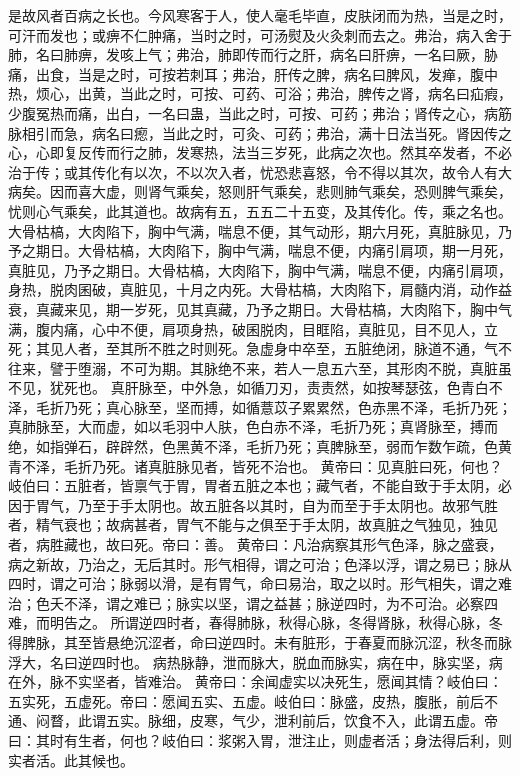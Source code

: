 \documentclass[a4paper,12pt,UTF8,twoside]{ctexbook}
\begin{document}
是故风者百病之长也。今风寒客于人，使人毫毛毕直，皮肤闭而为热，当是之时，可汗而发也；或痹不仁肿痛，当时之时，可汤熨及火灸刺而去之。弗治，病入舍于肺，名曰肺痹，发咳上气；弗治，肺即传而行之肝，病名曰肝痹，一名曰厥，胁痛，出食，当是之时，可按若刺耳；弗治，肝传之脾，病名曰脾风，发瘅，腹中热，烦心，出黄，当此之时，可按、可药、可浴；弗治，脾传之肾，病名曰疝瘕，少腹冤热而痛，出白，一名曰蛊，当此之时，可按、可药；弗治；肾传之心，病筋脉相引而急，病名曰瘛，当此之时，可灸、可药；弗治，满十日法当死。肾因传之心，心即复反传而行之肺，发寒热，法当三岁死，此病之次也。然其卒发者，不必治于传；或其传化有以次，不以次入者，忧恐悲喜怒，令不得以其次，故令人有大病矣。因而喜大虚，则肾气乘矣，怒则肝气乘矣，悲则肺气乘矣，恐则脾气乘矣，忧则心气乘矣，此其道也。故病有五，五五二十五变，及其传化。传，乘之名也。
大骨枯槁，大肉陷下，胸中气满，喘息不便，其气动形，期六月死，真脏脉见，乃予之期日。大骨枯槁，大肉陷下，胸中气满，喘息不便，内痛引肩项，期一月死，真脏见，乃予之期日。大骨枯槁，大肉陷下，胸中气满，喘息不便，内痛引肩项，身热，脱肉囷破，真脏见，十月之内死。大骨枯槁，大肉陷下，肩髓内消，动作益衰，真藏来见，期一岁死，见其真藏，乃予之期日。大骨枯槁，大肉陷下，胸中气满，腹内痛，心中不便，肩项身热，破囷脱肉，目眶陷，真脏见，目不见人，立死；其见人者，至其所不胜之时则死。急虚身中卒至，五脏绝闭，脉道不通，气不往来，譬于堕溺，不可为期。其脉绝不来，若人一息五六至，其形肉不脱，真脏虽不见，犹死也。
真肝脉至，中外急，如循刀刃，责责然，如按琴瑟弦，色青白不泽，毛折乃死；真心脉至，坚而搏，如循薏苡子累累然，色赤黑不泽，毛折乃死；真肺脉至，大而虚，如以毛羽中人肤，色白赤不泽，毛折乃死；真肾脉至，搏而绝，如指弹石，辟辟然，色黑黄不泽，毛折乃死；真脾脉至，弱而乍数乍疏，色黄青不泽，毛折乃死。诸真脏脉见者，皆死不治也。
黄帝曰：见真脏曰死，何也？岐伯曰：五脏者，皆禀气于胃，胃者五脏之本也；藏气者，不能自致于手太阴，必因于胃气，乃至于手太阴也。故五脏各以其时，自为而至于手太阴也。故邪气胜者，精气衰也；故病甚者，胃气不能与之俱至于手太阴，故真脏之气独见，独见者，病胜藏也，故曰死。帝曰：善。
黄帝曰：凡治病察其形气色泽，脉之盛衰，病之新故，乃治之，无后其时。形气相得，谓之可治；色泽以浮，谓之易已；脉从四时，谓之可治；脉弱以滑，是有胃气，命曰易治，取之以时。形气相失，谓之难治；色夭不泽，谓之难已；脉实以坚，谓之益甚；脉逆四时，为不可治。必察四难，而明告之。
所谓逆四时者，春得肺脉，秋得心脉，冬得肾脉，秋得心脉，冬得脾脉，其至皆悬绝沉涩者，命曰逆四时。未有脏形，于春夏而脉沉涩，秋冬而脉浮大，名曰逆四时也。
病热脉静，泄而脉大，脱血而脉实，病在中，脉实坚，病在外，脉不实坚者，皆难治。
黄帝曰：余闻虚实以决死生，愿闻其情？岐伯曰：五实死，五虚死。帝曰：愿闻五实、五虚。岐伯曰：脉盛，皮热，腹胀，前后不通、闷瞀，此谓五实。脉细，皮寒，气少，泄利前后，饮食不入，此谓五虚。帝曰：其时有生者，何也？岐伯曰：浆粥入胃，泄注止，则虚者活；身法得后利，则实者活。此其候也。
\end{document}
